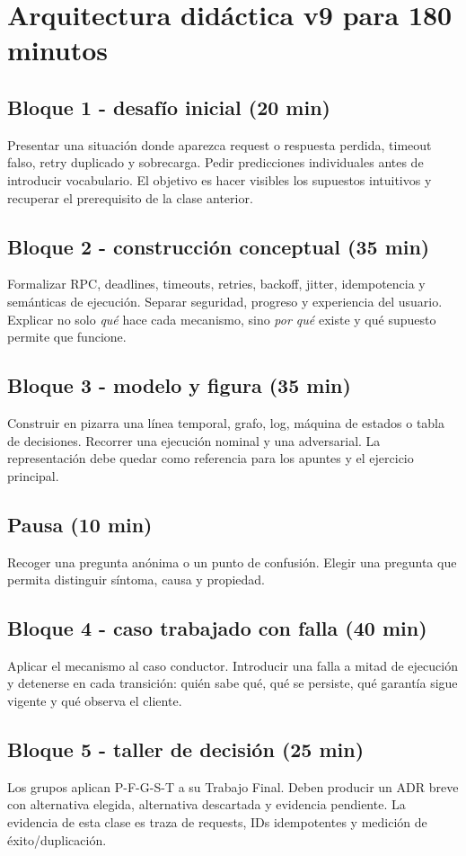 \documentclass[variant=docente,cover=institutional,mode=screen]{ua-engineering-v6-article}
\begin{document}
\section{Arquitectura didáctica v9 para 180 minutos}
\subsection*{Bloque 1 - desafío inicial (20 min)}
Presentar una situación donde aparezca request o respuesta perdida, timeout falso, retry duplicado y sobrecarga. Pedir predicciones individuales antes de introducir vocabulario. El objetivo es hacer visibles los supuestos intuitivos y recuperar el prerequisito de la clase anterior.

\subsection*{Bloque 2 - construcción conceptual (35 min)}
Formalizar RPC, deadlines, timeouts, retries, backoff, jitter, idempotencia y semánticas de ejecución. Separar seguridad, progreso y experiencia del usuario. Explicar no solo \emph{qué} hace cada mecanismo, sino \emph{por qué} existe y qué supuesto permite que funcione.

\subsection*{Bloque 3 - modelo y figura (35 min)}
Construir en pizarra una línea temporal, grafo, log, máquina de estados o tabla de decisiones. Recorrer una ejecución nominal y una adversarial. La representación debe quedar como referencia para los apuntes y el ejercicio principal.

\subsection*{Pausa (10 min)}
Recoger una pregunta anónima o un punto de confusión. Elegir una pregunta que permita distinguir síntoma, causa y propiedad.

\subsection*{Bloque 4 - caso trabajado con falla (40 min)}
Aplicar el mecanismo al caso conductor. Introducir una falla a mitad de ejecución y detenerse en cada transición: quién sabe qué, qué se persiste, qué garantía sigue vigente y qué observa el cliente.

\subsection*{Bloque 5 - taller de decisión (25 min)}
Los grupos aplican P-F-G-S-T a su Trabajo Final. Deben producir un ADR breve con alternativa elegida, alternativa descartada y evidencia pendiente. La evidencia de esta clase es traza de requests, IDs idempotentes y medición de éxito/duplicación.
\end{document}
